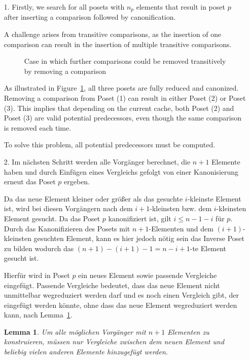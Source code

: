 \documentclass[10pt,journal,compsoc]{IEEEtran}
\newtheorem{lemma}{Lemma}
\begin{document}
\begin{itemize}
  \item[1.]
    Firstly, we search for all posets with $n_p$ elements that result in poset $p$ after inserting a comparison followed by canonification.

    A challenge arises from transitive comparisons, as the insertion of one comparison can result in the insertion of multiple transitive comparisons.

    \begin{figure}
      \centering
      
      \caption{Case in which further comparisons could be removed transitively by removing a comparison}
      \label{fig:backward_problematic}
    \end{figure}

    As illustrated in Figure~\ref{fig:backward_problematic}, all three posets are fully reduced and canonized.
    Removing a comparison from Poset (1) can result in either Poset (2) or Poset (3).
    This implies that depending on the current cache, both Poset (2) and Poset (3) are valid potential predecessors, even though the same comparison is removed each time.

    To solve this problem, all potential predecessors must be computed.

  \item[2.]
    Im nächsten Schritt werden alle Vorgänger berechnet, die $n + 1$ Elemente haben und durch Einfügen eines Vergleichs gefolgt von einer Kanonisierung erneut das Poset $p$ ergeben.

    Da das neue Element kleiner oder größer als das gesuchte $i$-kleinste Element ist, wird bei diesen Vorgängern nach dem $i + 1$-kleinsten bzw. dem $i$-kleinsten Element gesucht.
    Da das Poset $p$ kanonifiziert ist, gilt $i \leq n - 1 - i$ für $p$.
    Durch das Kanonifizieren des Posets mit $n + 1$-Elementen und dem $(i + 1)$-kleinsten gesuchten Element, kann es hier jedoch nötig sein das Inverse Poset zu bilden wodurch das $(n + 1) - (i + 1) - 1 = n - i + 1$-te Element gesucht ist.

    Hierfür wird in Poset $p$ ein neues Element sowie passende Vergleiche eingefügt.
    Passende Vergleiche bedeutet, dass das neue Element nicht unmittelbar wegreduziert werden darf und es noch einen Vergleich gibt, der eingefügt werden könnte, ohne dass das neue Element wegreduziert werden kann, nach Lemma~\ref{lemma:remove_only_last_element_edge}.

    \begin{lemma} \label{lemma:remove_only_last_element_edge}
      Um alle möglichen Vorgänger mit $n + 1$ Elementen zu konstruieren, müssen nur Vergleiche zwischen dem neuen Element und beliebig vielen anderen Elemente hinzugefügt werden.
    \end{lemma}


\end{itemize}
\end{document}
